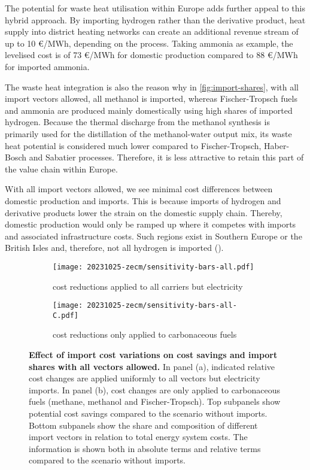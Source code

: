 
The potential for waste heat utilisation within Europe adds further appeal to
this hybrid approach. By importing hydrogen rather than the derivative product,
heat supply into district heating networks can create an additional revenue
stream of up to 10 \euro{}/MWh, depending on the process. Taking ammonia as
example, the levelised cost is of 73 \euro{}/MWh for domestic production compared
to 88 \euro{}/MWh for imported ammonia.

The waste heat integration is also the reason why in \cref{fig:import-shares},
with all import vectors allowed, all methanol is imported, whereas
Fischer-Tropsch fuels and ammonia are produced mainly domestically using high
shares of imported hydrogen. Because the thermal discharge from the methanol
synthesis is primarily used for the distillation of the methanol-water output
mix, its waste heat potential is considered much lower compared to
Fischer-Tropsch, Haber-Bosch and Sabatier processes. Therefore, it is less
attractive to retain this part of the value chain within Europe.


With all import vectors allowed, we see minimal cost differences between
domestic production and imports. This is because imports of hydrogen and
derivative products lower the strain on the domestic supply chain. Thereby,
domestic production would only be ramped up where it competes with imports and
associated infrastructure costs. Such regions exist in Southern Europe or the
British Isles and, therefore, not all hydrogen is imported
().

\begin{figure*}
    \begin{subfigure}[t]{\columnwidth}
        \caption{cost reductions applied to all carriers but electricity}
        \label{fig:sensitivity-costs:A}
        \texttt{[image: 20231025-zecm/sensitivity-bars-all.pdf]}
    \end{subfigure}
    \begin{subfigure}[t]{\columnwidth}
        \caption{cost reductions only applied to carbonaceous fuels}
        \label{fig:sensitivity-costs:B}
        \texttt{[image: 20231025-zecm/sensitivity-bars-all-C.pdf]}
    \end{subfigure}
    \caption{\textbf{Effect of import cost variations on cost savings and import shares with all vectors allowed.}
    In panel (a), indicated relative cost changes are applied uniformly to all
    vectors but electricity imports. In panel (b), cost changes are only applied
    to carbonaceous fuels (methane, methanol and Fischer-Tropsch). Top subpanels
    show potential cost savings compared to the scenario without imports. Bottom
    subpanels show the share and composition of different import vectors in
    relation to total energy system costs. The information is shown both in
    absolute terms and relative terms compared to the scenario without imports.
    }
    \label{fig:sensitivity-costs}
\end{figure*}

